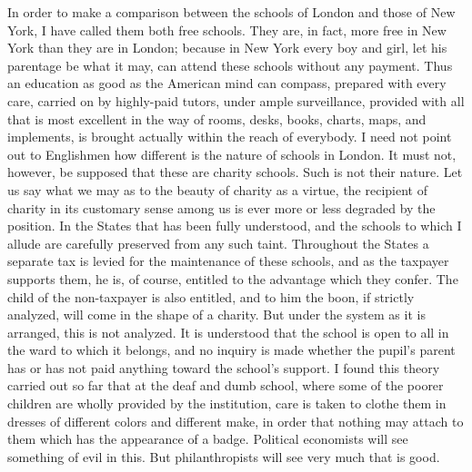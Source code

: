 In order to make a comparison between the schools of London and
those of New York, I have called them both free schools.  They are,
in fact, more free in New York than they are in London; because in
New York every boy and girl, let his parentage be what it may, can
attend these schools without any payment.  Thus an education as
good as the American mind can compass, prepared with every care,
carried on by highly-paid tutors, under ample surveillance,
provided with all that is most excellent in the way of rooms,
desks, books, charts, maps, and implements, is brought actually
within the reach of everybody.  I need not point out to Englishmen
how different is the nature of schools in London.  It must not,
however, be supposed that these are charity schools.  Such is not
their nature.  Let us say what we may as to the beauty of charity
as a virtue, the recipient of charity in its customary sense among
us is ever more or less degraded by the position.  In the States
that has been fully understood, and the schools to which I allude
are carefully preserved from any such taint.  Throughout the States
a separate tax is levied for the maintenance of these schools, and
as the taxpayer supports them, he is, of course, entitled to the
advantage which they confer.  The child of the non-taxpayer is also
entitled, and to him the boon, if strictly analyzed, will come in
the shape of a charity.  But under the system as it is arranged,
this is not analyzed.  It is understood that the school is open to
all in the ward to which it belongs, and no inquiry is made whether
the pupil's parent has or has not paid anything toward the school's
support.  I found this theory carried out so far that at the deaf
and dumb school, where some of the poorer children are wholly
provided by the institution, care is taken to clothe them in
dresses of different colors and different make, in order that
nothing may attach to them which has the appearance of a badge.
Political economists will see something of evil in this.  But
philanthropists will see very much that is good.

